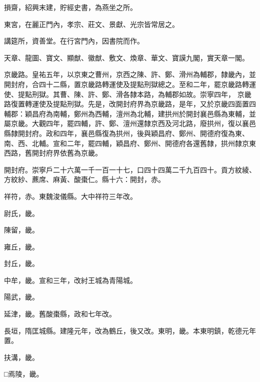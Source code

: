 \begin{pinyinscope}
 損齋，紹興末建，貯經史書，為燕坐之所。



 東宮，在麗正門內，孝宗、莊文、景獻、光宗皆常居之。



 講筵所，資善堂。在行宮門內，因書院而作。



 天章、龍圖、寶文、顯猷、徽猷、敷文、煥章、華文、寶謨九閣，實天章一閣。



 京畿路。皇祐五年，以京東之曹州，京西之陳、許、鄭、滑州為輔郡，隸畿內，並開封府，合四十二縣，置京畿路轉運使及提點刑獄總之。至和二年，罷京畿路轉運使、提點刑獄。其曹、陳、許、鄭、滑各隸本路，為輔郡如故。崇寧四年，
 京畿路復置轉運使及提點刑獄。先是，改開封府界為京畿路，是年，又於京畿四面置四輔郡：穎昌府為南輔，鄭州為西輔，澶州為北輔，建拱州於開封襄邑縣為東輔，並屬京畿。大觀四年，罷四輔，許、鄭、澶州還隸京西及河北路，廢拱州，復以襄邑縣隸開封府。政和四年，襄邑縣復為拱州，後與穎昌府、鄭州、開德府復為東、南、西、北輔。宣和二年，罷四輔，穎昌府、鄭州、開德府各還舊隸，拱州隸京東西路，舊開封府界依舊為京畿。



 開封府。崇寧戶二十六萬一千一百一十七，口四十四萬二千九百四十。貢方紋綾、方紋紗、藨席、麻黃、酸棗仁。縣十六：開封，赤。



 祥符，赤。東魏浚儀縣。大中祥符三年改。



 尉氏，畿。



 陳留，畿。



 雍丘，畿。



 封丘，畿。



 中牟，畿。宣和三年，改紂王城為青陽城。



 陽武，畿。



 延津，畿。舊酸棗縣，政和七年改。



 長垣，隋匡城縣。建隆元年，改為鶴丘，後又改。東明，畿。本東明鎮，乾德元年置。



 扶溝，畿。



 □焉陵，畿。




\end{pinyinscope}
